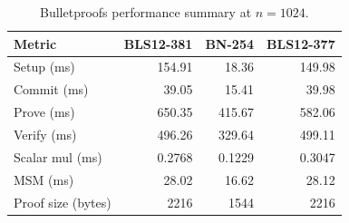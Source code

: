 \begin{table}[H]
\centering
\caption{Bulletproofs performance summary at $n = 1024$.}
\label{tab:bp-summary}
\begin{tabular}{lrrr}
\toprule
\textbf{Metric} & \textbf{BLS12-381} & \textbf{BN-254} & \textbf{BLS12-377} \\
\midrule
Setup (ms)         & 154.91 & 18.36  & 149.98 \\
Commit (ms)        & 39.05  & 15.41  & 39.98  \\
Prove (ms)         & 650.35 & 415.67 & 582.06 \\
Verify (ms)        & 496.26 & 329.64 & 499.11 \\
Scalar mul (ms)    & 0.2768 & 0.1229 & 0.3047 \\
MSM (ms)           & 28.02  & 16.62  & 28.12  \\
Proof size (bytes) & 2216   & 1544   & 2216   \\
\bottomrule
\end{tabular}
\end{table}